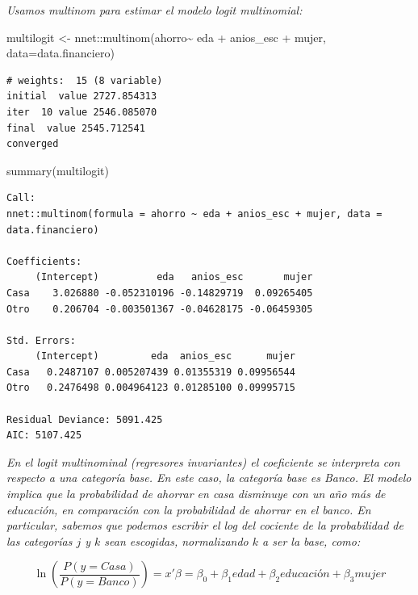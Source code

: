 \documentclass[
  letterpaper,
  DIV=11,
  numbers=noendperiod]{scrartcl}
\newenvironment{Shaded}{\begin{snugshade}}{\end{snugshade}}
\newcommand{\AttributeTok}[1]{\textcolor[rgb]{0.40,0.45,0.13}{#1}}
\newcommand{\FunctionTok}[1]{\textcolor[rgb]{0.28,0.35,0.67}{#1}}
\newcommand{\NormalTok}[1]{\textcolor[rgb]{0.00,0.23,0.31}{#1}}
\newcommand{\OtherTok}[1]{\textcolor[rgb]{0.00,0.23,0.31}{#1}}
\newcommand{\SpecialCharTok}[1]{\textcolor[rgb]{0.37,0.37,0.37}{#1}}
\begin{document}
\emph{Usamos multinom para estimar el modelo logit multinomial:}

\begin{Shaded}
\begin{Highlighting}[]
\NormalTok{multilogit }\OtherTok{\textless{}{-}}\NormalTok{ nnet}\SpecialCharTok{::}\FunctionTok{multinom}\NormalTok{(ahorro}\SpecialCharTok{\textasciitilde{}}\NormalTok{ eda }\SpecialCharTok{+}\NormalTok{ anios\_esc }\SpecialCharTok{+}\NormalTok{ mujer,}
                              \AttributeTok{data=}\NormalTok{data.financiero)}
\end{Highlighting}
\end{Shaded}

\begin{verbatim}
# weights:  15 (8 variable)
initial  value 2727.854313 
iter  10 value 2546.085070
final  value 2545.712541 
converged
\end{verbatim}

\begin{Shaded}
\begin{Highlighting}[]
\FunctionTok{summary}\NormalTok{(multilogit)}
\end{Highlighting}
\end{Shaded}

\begin{verbatim}
Call:
nnet::multinom(formula = ahorro ~ eda + anios_esc + mujer, data = data.financiero)

Coefficients:
     (Intercept)          eda   anios_esc       mujer
Casa    3.026880 -0.052310196 -0.14829719  0.09265405
Otro    0.206704 -0.003501367 -0.04628175 -0.06459305

Std. Errors:
     (Intercept)         eda  anios_esc      mujer
Casa   0.2487107 0.005207439 0.01355319 0.09956544
Otro   0.2476498 0.004964123 0.01285100 0.09995715

Residual Deviance: 5091.425 
AIC: 5107.425 
\end{verbatim}

\emph{En el logit multinominal (regresores invariantes) el coeficiente
se interpreta con respecto a una categoría base. En este caso, la
categoría base es Banco. El modelo implica que la probabilidad de
ahorrar en casa disminuye con un año más de educación, en comparación
con la probabilidad de ahorrar en el banco. En particular, sabemos que
podemos escribir el log del cociente de la probabilidad de las
categorías \(j\) y \(k\) sean escogidas, normalizando \(k\) a ser la
base, como:}

\[\ln\left(\frac{P(y=Casa)}{P(y=Banco)}\right)=x'\beta=\beta_0+\beta_1 edad + \beta_2 educación + \beta_3 mujer \]
\end{document}
